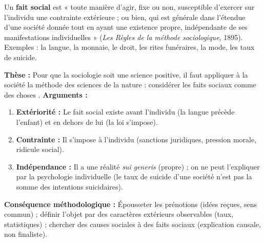 \documentclass[11pt]{article}
\newcommand{\cle}[1]{{\popxbold\color{popdark}#1}}
\begin{document}
\begin{definition}
Un \textbf{fait social} est « \guillemotleft toute manière d'agir, fixe ou non, susceptible d'exercer sur l'individu une contrainte extérieure ; ou bien, qui est générale dans l'étendue d'une société donnée tout en ayant une existence propre, indépendante de ses manifestations individuelles \guillemotright » (\emph{Les Règles de la méthode sociologique}, 1895). Exemples : la langue, la monnaie, le droit, les rites funéraires, la mode, les taux de suicide.
\end{definition}

\begin{propriete}
\textbf{Thèse :} Pour que la sociologie soit une science positive, il faut appliquer à la société la méthode des sciences de la nature : \guillemotleft considérer les faits sociaux comme des choses \guillemotright.
\textbf{Arguments :}
\begin{enumerate}
    \item \textbf{Extériorité :} Le fait social existe avant l'individu (la langue précède l'enfant) et en dehors de lui (la loi s'impose).
    \item \textbf{Contrainte :} Il s'impose à l'individu (sanctions juridiques, pression morale, ridicule social).
    \item \textbf{Indépendance :} Il a une réalité \emph{sui generis} (propre) ; on ne peut l'expliquer par la psychologie individuelle (le taux de suicide d'une société n'est pas la somme des intentions suicidaires).
\end{enumerate}
\textbf{Conséquence méthodologique :} Épousseter les \cle{prénotions} (idées reçues, sens commun) ; définir l'objet par des caractères extérieurs observables (taux, statistiques) ; chercher des causes sociales à des faits sociaux (explication causale, non finaliste).
\end{propriete}
\end{document}
